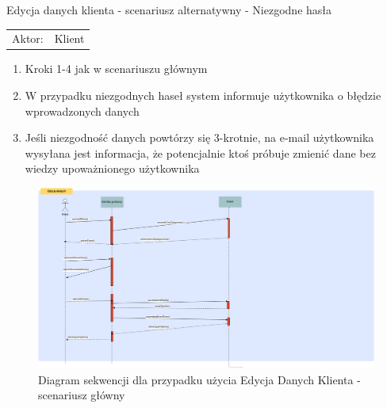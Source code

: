   
   \item Edycja danych klienta - scenariusz alternatywny - Niezgodne hasła\\
  \begin{tabularx}{\linewidth}{ c X }
  Aktor: & Klient \\
  \end{tabularx}
  \begin{enumerate}
    \item Kroki 1-4 jak w scenariuszu głównym
    \item W przypadku niezgodnych haseł system informuje użytkownika o błędzie
    wprowadzonych danych
    \item Jeśli niezgodność danych powtórzy się 3-krotnie, na e-mail użytkownika
    wysyłana jest informacja, że potencjalnie ktoś próbuje zmienić dane bez
    wiedzy upoważnionego użytkownika
  \end{enumerate}
  
  
  
  \begin{figure}[h!]
    \includegraphics[width=\textwidth,
    height=0.5\textheight]{graphics/UseCase/Klient/EdycjaDanychKlientaSD.png}
  \caption{Diagram sekwencji dla przypadku użycia Edycja Danych Klienta -
  scenariusz główny}
\end{figure}